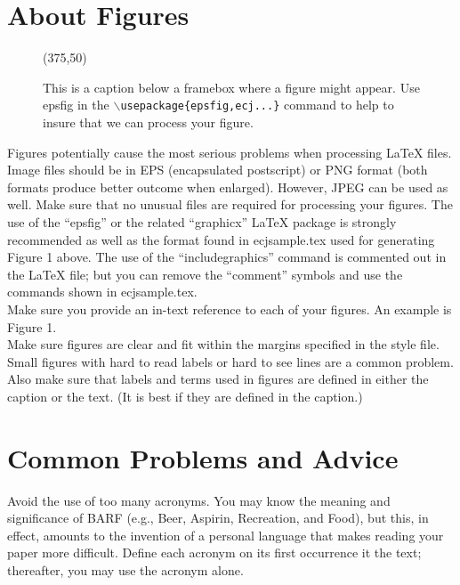 \documentclass[twoside]{article}
\begin{document}
\section{About Figures}

\begin{figure}[t]
\begin{center}
\centerline{
\framebox(375,50)
}
\end{center}
\caption{This is a caption below a framebox where a figure might appear.  
         Use epsfig in the {\tt $\backslash$usepackage\{epsfig,ecj...\}} 
         command to help to insure that we can process your figure.}
\label{graph1}
\end{figure}

Figures potentially cause the most serious problems when processing \LaTeX{}
files. Image files should be in EPS (encapsulated postscript) or 
PNG format (both formats produce better outcome when enlarged). However, JPEG 
can be used as well. Make sure that no unusual files are required for 
processing your figures.
The use of the ``epsfig'' or the related ``graphicx'' \LaTeX{} package is 
strongly recommended as well as the
format found in ecjsample.tex used for generating Figure 1 above.
The use of the ``includegraphics'' command is commented out in the \LaTeX{} 
file;
but you can remove the ``comment'' symbols and use the
commands shown in ecjsample.tex.\\

Make sure you provide an in-text reference to each of your figures.  An 
example is Figure 1.\\

Make sure figures are clear and fit within the margins specified in the 
style file.  Small figures with hard to read labels or hard to see lines are 
a common problem.  Also make sure that labels and terms used in figures are
defined in either the caption or the text. (It is best if they
are defined in the caption.)

\section{Common Problems and Advice}

Avoid the use of too many acronyms. You may know the meaning and 
significance of BARF (e.g., Beer, Aspirin, Recreation, and Food), but this, 
in effect, amounts to the invention of a personal language that makes 
reading your paper more difficult.  Define each acronym on its first 
occurrence it the text; thereafter, you may use the acronym alone.\\
\end{document}
